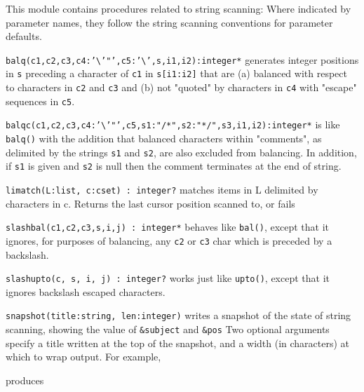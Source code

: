 This module contains procedures related to string
scanning: Where indicated by parameter names, they follow the string
scanning conventions for parameter defaults.

\texttt{balq(c1,c2,c3,c4:'{\textbackslash}'"',c5:'{\textbackslash}',s,i1,i2):integer*}
generates integer positions in \texttt{s} preceding a character of
\texttt{c1} in \texttt{s[i1:i2]} that are (a) balanced with respect to
characters in \texttt{c2} and \texttt{c3} and (b) not
"quoted" by characters in \texttt{c4} with
"escape" sequences in
\texttt{c5}.

\texttt{balqc(c1,c2,c3,c4:'{\textbackslash}'"',c5,s1:"/*",s2:"*/",s3,i1,i2):integer*}
is like \texttt{balq()} with the addition that balanced characters
within "comments", as delimited by the
strings \texttt{s1} and \texttt{s2}, are also excluded from balancing.
In addition, if \texttt{s1} is given and \texttt{s2} is null then the
comment terminates at the end of string.

\texttt{limatch(L:list, c:cset) : integer?} matches items in L delimited
by characters in c. Returns the last cursor position scanned to, or
fails 

\texttt{slashbal(c1,c2,c3,s,i,j) : integer*} behaves like
\texttt{bal()}, except that it ignores, for purposes of balancing, any
\texttt{c2} or \texttt{c3} char which is preceded by a backslash.

\texttt{slashupto(c, s, i, j) : integer?} works just like
\texttt{upto()}, except that it ignores backslash escaped characters.

\texttt{snapshot(title:string, len:integer)} writes a snapshot of the
state of string scanning, showing the value of \texttt{\&subject} and
\texttt{\&pos} Two optional arguments specify a title written at the
top of the snapshot, and a width (in characters) at which to wrap
output. For example,


\noindent produces


